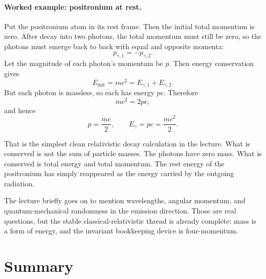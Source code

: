 \paragraph{Worked example: positronium at rest.}
Put the positronium atom in its rest frame. Then the initial total momentum is zero. After decay into two photons, the total momentum must still be zero, so the photons must emerge back to back with equal and opposite momenta:
\begin{equation}
p_{\gamma,1}=-p_{\gamma,2}.
\end{equation}
Let the magnitude of each photon's momentum be \(p\). Then energy conservation gives
\begin{equation}
E_{\text{init}} = mc^2 = E_{\gamma,1}+E_{\gamma,2}.
\end{equation}
But each photon is massless, so each has energy \(pc\). Therefore
\begin{equation}
mc^2 = 2pc,
\end{equation}
and hence
\begin{equation}
p=\frac{mc}{2},
\qquad
E_\gamma = pc = \frac{mc^2}{2}.
\end{equation}

That is the simplest clean relativistic decay calculation in the lecture. What is conserved is not the sum of particle masses. The photons have zero mass. What is conserved is total energy and total momentum. The rest energy of the positronium has simply reappeared as the energy carried by the outgoing radiation.

The lecture briefly goes on to mention wavelengths, angular momentum, and quantum-mechanical randomness in the emission direction. Those are real questions, but the stable classical-relativistic thread is already complete: mass is a form of energy, and the invariant bookkeeping device is four-momentum.

\section{Summary}

